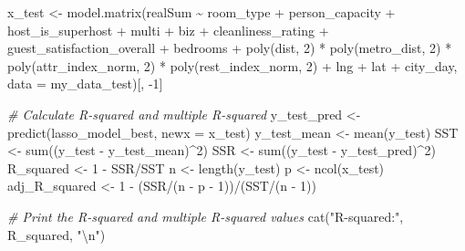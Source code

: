 \documentclass[
]{article}
\newenvironment{Shaded}{\begin{snugshade}}{\end{snugshade}}
\newcommand{\AttributeTok}[1]{\textcolor[rgb]{0.77,0.63,0.00}{#1}}
\newcommand{\CommentTok}[1]{\textcolor[rgb]{0.56,0.35,0.01}{\textit{#1}}}
\newcommand{\DecValTok}[1]{\textcolor[rgb]{0.00,0.00,0.81}{#1}}
\newcommand{\FunctionTok}[1]{\textcolor[rgb]{0.00,0.00,0.00}{#1}}
\newcommand{\NormalTok}[1]{#1}
\newcommand{\OtherTok}[1]{\textcolor[rgb]{0.56,0.35,0.01}{#1}}
\newcommand{\SpecialCharTok}[1]{\textcolor[rgb]{0.00,0.00,0.00}{#1}}
\newcommand{\StringTok}[1]{\textcolor[rgb]{0.31,0.60,0.02}{#1}}
\begin{document}
\begin{Shaded}
\begin{Highlighting}[]
\NormalTok{x\_test }\OtherTok{\textless{}{-}} \FunctionTok{model.matrix}\NormalTok{(realSum }\SpecialCharTok{\textasciitilde{}}\NormalTok{ room\_type }\SpecialCharTok{+}\NormalTok{ person\_capacity }\SpecialCharTok{+}
\NormalTok{    host\_is\_superhost }\SpecialCharTok{+}\NormalTok{ multi }\SpecialCharTok{+}\NormalTok{ biz }\SpecialCharTok{+}\NormalTok{ cleanliness\_rating }\SpecialCharTok{+}\NormalTok{ guest\_satisfaction\_overall }\SpecialCharTok{+}
\NormalTok{    bedrooms }\SpecialCharTok{+} \FunctionTok{poly}\NormalTok{(dist, }\DecValTok{2}\NormalTok{) }\SpecialCharTok{*} \FunctionTok{poly}\NormalTok{(metro\_dist, }\DecValTok{2}\NormalTok{) }\SpecialCharTok{*} \FunctionTok{poly}\NormalTok{(attr\_index\_norm,}
    \DecValTok{2}\NormalTok{) }\SpecialCharTok{*} \FunctionTok{poly}\NormalTok{(rest\_index\_norm, }\DecValTok{2}\NormalTok{) }\SpecialCharTok{+}\NormalTok{ lng }\SpecialCharTok{+}\NormalTok{ lat }\SpecialCharTok{+}\NormalTok{ city\_day, }\AttributeTok{data =}\NormalTok{ my\_data\_test)[,}
    \SpecialCharTok{{-}}\DecValTok{1}\NormalTok{]}

\CommentTok{\# Calculate R{-}squared and multiple R{-}squared}
\NormalTok{y\_test\_pred }\OtherTok{\textless{}{-}} \FunctionTok{predict}\NormalTok{(lasso\_model\_best, }\AttributeTok{newx =}\NormalTok{ x\_test)}
\NormalTok{y\_test\_mean }\OtherTok{\textless{}{-}} \FunctionTok{mean}\NormalTok{(y\_test)}
\NormalTok{SST }\OtherTok{\textless{}{-}} \FunctionTok{sum}\NormalTok{((y\_test }\SpecialCharTok{{-}}\NormalTok{ y\_test\_mean)}\SpecialCharTok{\^{}}\DecValTok{2}\NormalTok{)}
\NormalTok{SSR }\OtherTok{\textless{}{-}} \FunctionTok{sum}\NormalTok{((y\_test }\SpecialCharTok{{-}}\NormalTok{ y\_test\_pred)}\SpecialCharTok{\^{}}\DecValTok{2}\NormalTok{)}
\NormalTok{R\_squared }\OtherTok{\textless{}{-}} \DecValTok{1} \SpecialCharTok{{-}}\NormalTok{ SSR}\SpecialCharTok{/}\NormalTok{SST}
\NormalTok{n }\OtherTok{\textless{}{-}} \FunctionTok{length}\NormalTok{(y\_test)}
\NormalTok{p }\OtherTok{\textless{}{-}} \FunctionTok{ncol}\NormalTok{(x\_test)}
\NormalTok{adj\_R\_squared }\OtherTok{\textless{}{-}} \DecValTok{1} \SpecialCharTok{{-}}\NormalTok{ (SSR}\SpecialCharTok{/}\NormalTok{(n }\SpecialCharTok{{-}}\NormalTok{ p }\SpecialCharTok{{-}} \DecValTok{1}\NormalTok{))}\SpecialCharTok{/}\NormalTok{(SST}\SpecialCharTok{/}\NormalTok{(n }\SpecialCharTok{{-}} \DecValTok{1}\NormalTok{))}


\CommentTok{\# Print the R{-}squared and multiple R{-}squared values}
\FunctionTok{cat}\NormalTok{(}\StringTok{"R{-}squared:"}\NormalTok{, R\_squared, }\StringTok{"}\SpecialCharTok{\textbackslash{}n}\StringTok{"}\NormalTok{)}
\end{Highlighting}
\end{Shaded}
\end{document}
